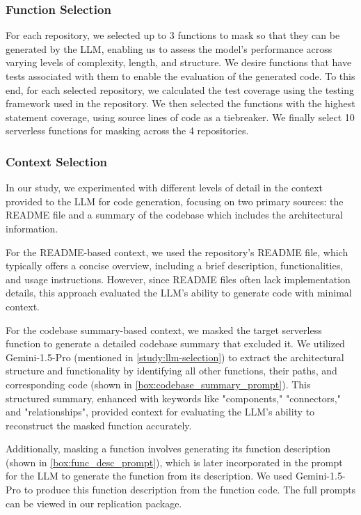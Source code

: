 \subsubsection{Function Selection}
For each repository, we selected up to 3 functions to mask so that they can be generated by the LLM, enabling us to assess the model's performance across varying levels of complexity, length, and structure. We desire functions that have tests associated with them to enable the evaluation of the generated code. To this end, for each selected repository, we calculated the test coverage using the testing framework used in the repository. We then selected the functions with the highest statement coverage, using source lines of code as a tiebreaker. We finally select 10 serverless functions for masking across the 4 repositories.

\subsubsection{Context Selection} \label{study:context}
In our study, we experimented with different levels of detail in the context provided to the LLM for code generation, focusing on two primary sources: the README file and a summary of the codebase which includes the architectural information.

For the README-based context, we used the repository’s README file, which typically offers a concise overview, including a brief description, functionalities, and usage instructions. 
However, since README files often lack implementation details, this approach evaluated the LLM’s ability to generate code with minimal context.

For the codebase summary-based context, we masked the target serverless function to generate a detailed codebase summary that excluded it. 
We utilized Gemini-1.5-Pro (mentioned in \ref{study:llm-selection}) to extract the architectural structure and functionality by identifying all other functions, their paths, and corresponding code (shown in \ref{box:codebase_summary_prompt}).
This structured summary, enhanced with keywords like "components," "connectors," and "relationships", provided context for evaluating the LLM’s ability to reconstruct the masked function accurately.


\vspace*{-10pt}

Additionally, masking a function involves generating its function description (shown in \ref{box:func_desc_prompt}), which is later incorporated in the prompt for the LLM to generate the function from its description. We used Gemini-1.5-Pro to produce this function description from the function code. The full prompts can be viewed in our replication package.

